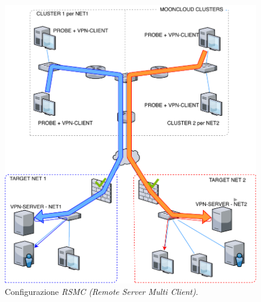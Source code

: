 \begin{figure}
  \includegraphics[scale=0.45]{img/rsmc}
  \caption[Configurazione \textit{RSMC (Remote Server Multi Client)}]{Configurazione \textit{RSMC (Remote Server Multi Client)}.}
\end{figure}
